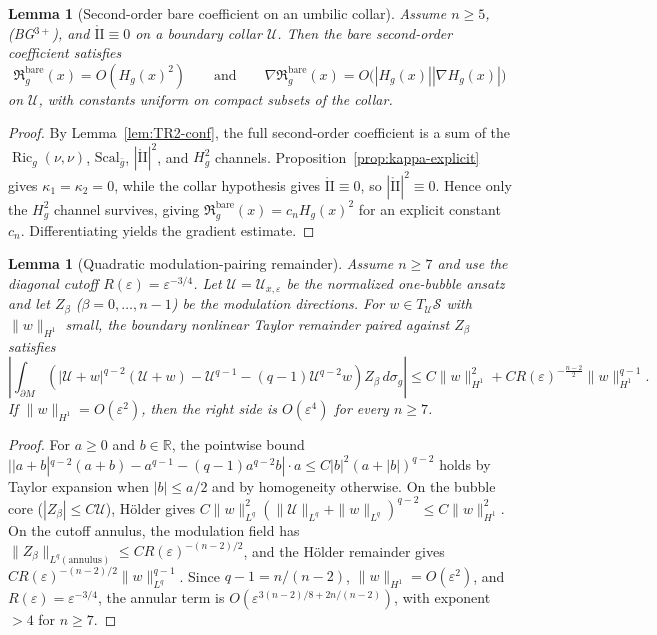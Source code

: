 \documentclass[11pt,reqno,a4paper]{amsart}
\numberwithin{equation}{section}
\theoremstyle{plain}
\newtheorem{lemma}[theorem]{Lemma}
\newcommand{\Scal}{\mathrm{Scal}}
\theoremstyle{remark}
\theoremstyle{plain}
\begin{document}
\begin{lemma}[Second-order bare coefficient on an umbilic collar]
\label{lem:Rbare-umbilic-H2}
Assume $n\ge5$, \textup{(BG$^{3+}$)}, and $\mathring{\mathrm{II}}\equiv0$ on a boundary collar $\mathcal U$.
Then the bare second-order coefficient satisfies
\[
\mathfrak R_g^{\mathrm{bare}}(x)=O(H_g(x)^2)
\qquad\text{and}\qquad
\nabla\mathfrak R_g^{\mathrm{bare}}(x)=O\bigl(|H_g(x)||\nabla H_g(x)|\bigr)
\]
on $\mathcal U$, with constants uniform on compact subsets of the collar.
\end{lemma}

\begin{proof}
By Lemma~\ref{lem:TR2-conf}, the full second-order coefficient is a sum of the
$\operatorname{Ric}_g(\nu,\nu)$, $\Scal_{\bar g}$, $|\mathring{\mathrm{II}}|^2$, and $H_g^2$
channels. Proposition~\ref{prop:kappa-explicit} gives $\kappa_1=\kappa_2=0$,
while the collar hypothesis gives $\mathring{\mathrm{II}}\equiv0$, so
$|\mathring{\mathrm{II}}|^2\equiv0$. Hence only the $H_g^2$ channel survives, giving
$\mathfrak R_g^{\mathrm{bare}}(x)=c_n H_g(x)^2$ for an explicit constant $c_n$.
Differentiating yields the gradient estimate.
\end{proof}

\begin{lemma}[Quadratic modulation-pairing remainder]
\label{lem:modulation-pairing-quadratic}
Assume $n\ge7$ and use the diagonal cutoff $R(\varepsilon)=\varepsilon^{-3/4}$.
Let $\mathcal U=\mathcal U_{x,\varepsilon}$ be the normalized one-bubble ansatz
and let $Z_\beta$ ($\beta=0,\dots,n-1$) be the modulation directions.
For $w\in T_{\mathcal U}\mathcal S$ with $\|w\|_{H^1}$ small, the boundary
nonlinear Taylor remainder paired against $Z_\beta$ satisfies
\begin{equation}\label{eq:modulation-pairing-bound}
\left|
\int_{\partial M}
\left(
|\mathcal U+w|^{q-2}(\mathcal U+w)
-\mathcal U^{q-1}
-(q-1)\mathcal U^{q-2}w
\right)
Z_\beta\,d\sigma_g
\right|
\le
C\|w\|_{H^1}^2
+
C R(\varepsilon)^{-\frac{n-2}{2}}\|w\|_{H^1}^{q-1}.
\end{equation}
If $\|w\|_{H^1}=O(\varepsilon^2)$, then the right side is $O(\varepsilon^4)$
for every $n\ge7$.
\end{lemma}

\begin{proof}
For $a\ge0$ and $b\in\mathbb R$, the pointwise bound
$||a+b|^{q-2}(a+b)-a^{q-1}-(q-1)a^{q-2}b|\cdot a
\le C|b|^2(a+|b|)^{q-2}$
holds by Taylor expansion when $|b|\le a/2$ and by homogeneity otherwise.
On the bubble core ($|Z_\beta|\le C\mathcal U$), H\"older gives
$C\|w\|_{L^q}^2(\|\mathcal U\|_{L^q}+\|w\|_{L^q})^{q-2}
\le C\|w\|_{H^1}^2$.
On the cutoff annulus, the modulation field has
$\|Z_\beta\|_{L^q(\mathrm{annulus})}\le CR(\varepsilon)^{-(n-2)/2}$,
and the H\"older remainder gives
$C R(\varepsilon)^{-(n-2)/2}\|w\|_{L^q}^{q-1}$.
Since $q-1=n/(n-2)$, $\|w\|_{H^1}=O(\varepsilon^2)$, and
$R(\varepsilon)=\varepsilon^{-3/4}$, the annular term is
$O(\varepsilon^{3(n-2)/8+2n/(n-2)})$, with exponent $>4$ for $n\ge7$.
\end{proof}
\end{document}
